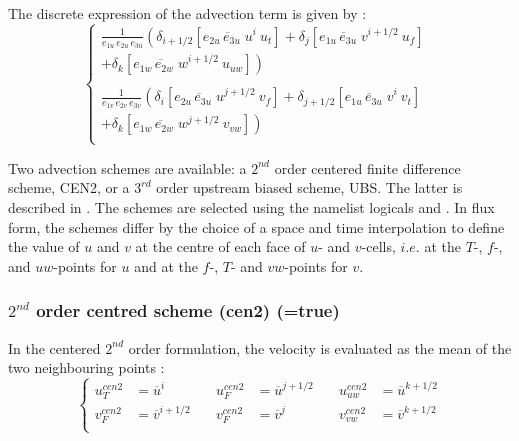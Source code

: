 The discrete expression of the advection term is given by :
\begin{equation} \label{Eq_dynadv}
\left\{ 
\begin{aligned}
\frac{1}{e_{1u}\,e_{2u}\,e_{3u}} 
\left(      \delta _{i+1/2} \left[ \overline{e_{2u}\,e_{3u}\;u }^{i       }  \ u_t      \right]    
          + \delta _{j       } \left[ \overline{e_{1u}\,e_{3u}\;v }^{i+1/2}  \ u_f      \right] \right.  \ \;   \\
\left.   + \delta _{k      } \left[ \overline{e_{1w}\,e_{2w}\;w}^{i+1/2}  \ u_{uw} \right] \right)   \\
\\
\frac{1}{e_{1v}\,e_{2v}\,e_{3v}} 
\left(     \delta _{i       } \left[ \overline{e_{2u}\,e_{3u }\;u }^{j+1/2} \ v_f       \right] 
         + \delta _{j+1/2} \left[ \overline{e_{1u}\,e_{3u }\;v }^{i       } \ v_t       \right] \right.  \ \, \, \\
\left.  + \delta _{k      } \left[ \overline{e_{1w}\,e_{2w}\;w}^{j+1/2} \ v_{vw}  \right] \right) \\
\end{aligned}
\right.
\end{equation}

Two advection schemes are available: a $2^{nd}$ order centered finite 
difference scheme, CEN2, or a $3^{rd}$ order upstream biased scheme, UBS. 
The latter is described in \citet{Shchepetkin_McWilliams_OM05}. The schemes are 
selected using the namelist logicals  and . 
In flux form, the schemes differ by the choice of a space and time interpolation to 
define the value of $u$ and $v$ at the centre of each face of $u$- and $v$-cells, 
$i.e.$ at the $T$-, $f$-, and $uw$-points for $u$ and at the $f$-, $T$- and 
$vw$-points for $v$. 

\subsubsection{$2^{nd}$ order centred scheme (cen2) (=true)}
\label{DYN_adv_cen2}

In the centered $2^{nd}$ order formulation, the velocity is evaluated as the 
mean of the two neighbouring points :
\begin{equation} \label{Eq_dynadv_cen2}
\left\{ 		\begin{aligned}
 u_T^{cen2} &=\overline u^{i }       \quad &  u_F^{cen2} &=\overline u^{j+1/2}  \quad &  u_{uw}^{cen2} &=\overline u^{k+1/2}   \\
 v_F^{cen2} &=\overline v ^{i+1/2} \quad & v_F^{cen2} &=\overline v^j		\quad &  v_{vw}^{cen2} &=\overline v ^{k+1/2}  \\
\end{aligned}      \right.
\end{equation} 

